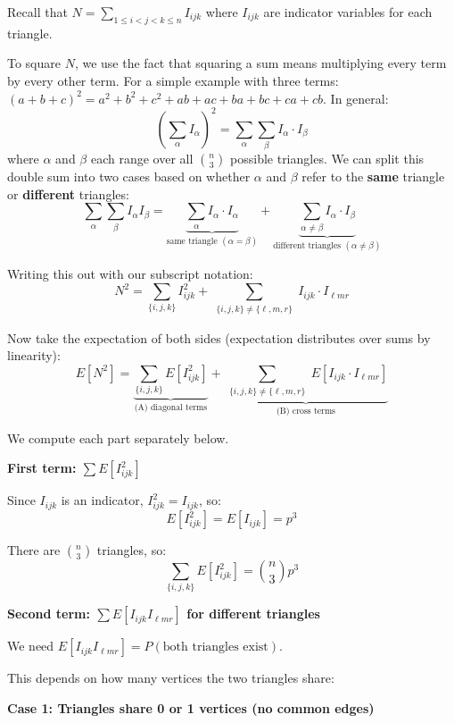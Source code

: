 \documentclass[11pt]{article}
\begin{document}
Recall that $N = \sum_{1 \leq i < j < k \leq n} I_{ijk}$ where $I_{ijk}$ are indicator variables for each triangle.

To square $N$, we use the fact that squaring a sum means multiplying every term by every other term. For a simple example with three terms: $(a + b + c)^2 = a^2 + b^2 + c^2 + ab + ac + ba + bc + ca + cb$. In general:
\[
\left(\sum_{\alpha} I_\alpha\right)^2 = \sum_{\alpha} \sum_{\beta} I_\alpha \cdot I_\beta
\]
where $\alpha$ and $\beta$ each range over all $\binom{n}{3}$ possible triangles. We can split this double sum into two cases based on whether $\alpha$ and $\beta$ refer to the \textbf{same} triangle or \textbf{different} triangles:
\[
\sum_{\alpha} \sum_{\beta} I_\alpha I_\beta
= \underbrace{\sum_{\alpha} I_\alpha \cdot I_\alpha}_{\text{same triangle } (\alpha = \beta)}
+ \underbrace{\sum_{\alpha \neq \beta} I_\alpha \cdot I_\beta}_{\text{different triangles } (\alpha \neq \beta)}
\]

Writing this out with our subscript notation:
\[
N^2 = \sum_{\{i,j,k\}} I_{ijk}^2 + \sum_{\substack{\{i,j,k\} \neq \{\ell,m,r\}}} I_{ijk} \cdot I_{\ell mr}
\]

Now take the expectation of both sides (expectation distributes over sums by linearity):
\[
E[N^2] = \underbrace{\sum_{\{i,j,k\}} E[I_{ijk}^2]}_{\text{(A) diagonal terms}} + \underbrace{\sum_{\substack{\{i,j,k\} \neq \{\ell,m,r\}}} E[I_{ijk} \cdot I_{\ell mr}]}_{\text{(B) cross terms}}
\]

We compute each part separately below.

\vspace{0.5em}

\textbf{First term: $\sum E[I_{ijk}^2]$}

Since $I_{ijk}$ is an indicator, $I_{ijk}^2 = I_{ijk}$, so:
\[
E[I_{ijk}^2] = E[I_{ijk}] = p^3
\]

There are $\binom{n}{3}$ triangles, so:
\[
\sum_{\{i,j,k\}} E[I_{ijk}^2] = \binom{n}{3} p^3
\]

\vspace{0.5em}

\textbf{Second term: $\sum E[I_{ijk} I_{\ell mr}]$ for different triangles}

We need $E[I_{ijk} I_{\ell mr}] = P(\text{both triangles exist})$.

This depends on how many vertices the two triangles share:

\vspace{0.5em}

\textbf{Case 1: Triangles share 0 or 1 vertices (no common edges)}
\end{document}
